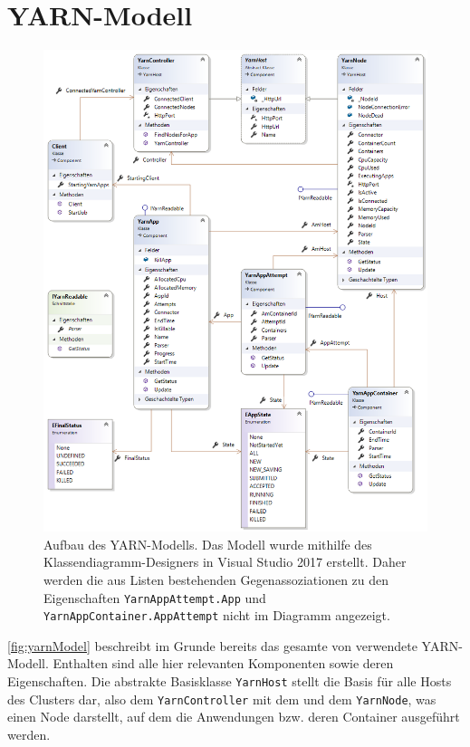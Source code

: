 \section{YARN-Modell}\label{sec:yarnModel}

\begin{figure}
	\centering
	\includegraphics[width=\columnwidth]{./images/yarnModel.png}
	\caption[Aufbau des YARN-Modells]{Aufbau des YARN-Modells. Das Modell wurde mithilfe des Klassendiagramm-Designers in Visual Studio 2017 erstellt. Daher werden die aus Listen bestehenden Gegenassoziationen zu den Eigenschaften \texttt{YarnAppAttempt.App} und \texttt{YarnAppContainer.AppAttempt} nicht im Diagramm angezeigt.}
	\label{fig:yarnModel}
\end{figure}

\autoref{fig:yarnModel} beschreibt im Grunde bereits das gesamte von \sS verwendete YARN-Modell. Enthalten sind alle hier relevanten Komponenten sowie deren Eigenschaften. Die abstrakte Basisklasse \texttt{YarnHost} stellt die Basis für alle Hosts des Clusters dar, also dem \texttt{YarnController} mit dem  und dem \texttt{YarnNode}, was einen Node darstellt, auf dem die Anwendungen bzw. deren Container ausgeführt werden.